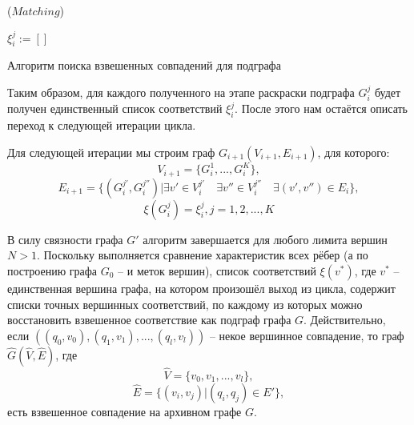 \begin{algorithm}[H]
	\Large
	\Begin($Matching$){
		
		$\xi_i^j := []$
		
		
	}
	
	\caption{Алгоритм поиска взвешенных совпадений для подграфа}
	\label{alg:findall}
\end{algorithm}

Таким образом, для каждого полученного на этапе раскраски подграфа $G_i^j$ будет получен единственный список соответствий $\xi_i^j$. После этого нам остаётся описать переход к следующей итерации цикла.

Для следующей итерации мы строим граф $G_{i+1}(V_{i+1}, E_{i+1})$, для которого:
\[V_{i+1} = \{G_i^1, ..., G_i^K\}, \]
\[E_{i+1} = \{(G_i^{j'}, G_i^{j''}) | \exists v' \in V_i^{j'} \quad \exists v'' \in V_i^{j''} \quad \exists (v', v'') \in E_i \}, \]
\[\xi(G_i^j) = \xi_i^j, j = 1, 2, ..., K\]

В силу связности графа $G'$ алгоритм завершается для любого лимита вершин $N > 1$. Поскольку выполняется сравнение характеристик всех рёбер (а по построению графа $G_0$ -- и меток вершин), список соответствий $\xi(v^{*})$, где $v^{*}$ -- единственная вершина графа, на котором произошёл выход из цикла, содержит списки точных вершинных соответствий, по каждому из которых можно восстановить взвешенное соответствие как подграф графа $G$. Действительно, если $((q_0, v_0), (q_1, v_1), ..., (q_l, v_l))$ -- некое вершинное совпадение, то граф $\widehat{G}(\widehat{V}, \widehat{E})$, где
\[\widehat{V} = \{v_0, v_1, ..., v_l\},\]
\[\widehat{E} = \{(v_i, v_j) | (q_i, q_j) \in E'\},\]
есть взвешенное совпадение на архивном графе $G$.